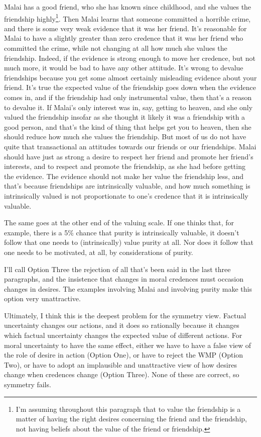 \documentclass[
  10pt,
  letterpaper,
  twoside]{scrbook}
\begin{document}
{Malai} has a good friend, who she has known since childhood, and she
values the friendship highly\footnote{I'm assuming throughout this
  paragraph that to value the friendship is a matter of having the right
  desires concerning the friend and the friendship, not having beliefs
  about the value of the friend or friendship.}. Then {Malai} learns
that someone committed a horrible crime, and there is some very weak
evidence that it was her friend. It's reasonable for {Malai} to have a
slightly greater than zero credence that it was her friend who committed
the crime, while not changing at all how much she values the friendship.
Indeed, if the evidence is strong enough to move her credence, but not
much more, it would be bad to have any other attitude. It's wrong to
devalue friendships because you get some almost certainly misleading
evidence about your friend. It's true the expected value of the
friendship goes down when the evidence comes in, and if the friendship
had only instrumental value, then that's a reason to devalue it. If
{Malai}'s only interest was in, say, getting to heaven, and she only
valued the friendship insofar as she thought it likely it was a
friendship with a good person, and that's the kind of thing that helps
get you to heaven, then she should reduce how much she values the
friendship. But most of us do not have quite that transactional an
attitudes towards our friends or our friendships. {Malai} should have
just as strong a desire to respect her friend and promote her friend's
interests, and to respect and promote the friendship, as she had before
getting the evidence. The evidence should not make her value the
friendship less, and that's because friendships are intrinsically
valuable, and how much something is intrinsically valued is not
proportionate to one's credence that it is intrinsically valuable.

The same goes at the other end of the valuing scale. If one thinks that,
for example, there is a 5\% chance that purity is intrinsically
valuable, it doesn't follow that one needs to (intrinsically) value
purity at all. Nor does it follow that one needs to be motivated, at
all, by considerations of purity.

I'll call Option Three the rejection of all that's been said in the last
three paragraphs, and the insistence that changes in moral credences
must occasion changes in desires. The examples involving {Malai} and
involving purity make this option very unattractive.

Ultimately, I think this is the deepest problem for the symmetry view.
Factual uncertainty changes our actions, and it does so rationally
because it changes which factual uncertainty changes the expected value
of different actions. For moral uncertainty to have the same effect,
either we have to have a false view of the role of desire in action
(Option One), or have to reject the WMP (Option Two), or have to adopt
an implausible and unattractive view of how desires change when
credences change (Option Three). None of these are correct, so symmetry
fails.
\end{document}
